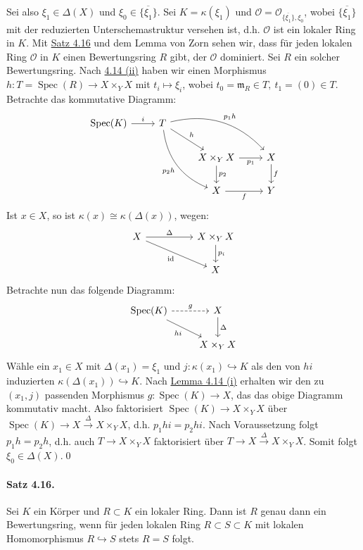 \begin{itemize}
Sei also $\xi_1\in\Delta(X)$ und $\xi_0\in\overline{\{\xi_1\}}$. Sei $K=\kappa(\xi_1)$ und $\mathcal{O}=\mathcal{O}_{\overline{\{\xi_1\}},\xi_0}$, wobei $\overline{\{\xi_1\}}$ mit der reduzierten Unterschemastruktur versehen ist, d.h. $\mathcal{O}$ ist ein lokaler Ring in $K$. Mit \hyperref[4.16]{Satz 4.16} und dem Lemma von Zorn sehen wir, dass für jeden lokalen Ring $\mathcal{O}$ in $K$ einen Bewertungsring $R$ gibt, der $\mathcal{O}$ dominiert. Sei $R$ ein solcher Bewertungsring. Nach \hyperref[4.14]{4.14 (ii)} haben wir einen Morphismus $h:T=\operatorname{Spec}(R)\to X\times_YX$ mit $t_i\mapsto\xi_i$, wobei $t_0=\mathfrak{m}_R\in T,\ t_1=(0)\in T$. Betrachte das kommutative Diagramm:
\[\begin{tikzcd}
\operatorname{Spec}(K)\ar[r, "i"] & T\ar[dr, "h"]\ar[rrd, "p_1h", bend left]\ar[ddr, "p_2h"', bend right]\\
& & X\times_YX\ar[r, "p_1"']\ar[d, "p_2"] & X\ar[d, "f"]\\
&& X\ar[r, "f"'] & Y
\end{tikzcd}\]
Ist $x\in X$, so ist $\kappa(x)\cong\kappa(\Delta(x))$, wegen:
\[\begin{tikzcd}
X\ar[rr, "\Delta"]\ar[rrd, "\operatorname{id}"'] & & X\times_Y X\ar[d, "p_i"]\\
&& X
\end{tikzcd} \]
Betrachte nun das folgende Diagramm:
\[\begin{tikzcd}
\operatorname{Spec}(K)\ar[rd, "hi"']\ar[r, "g", dashed] & X\ar[d, "\Delta"] \\
& X\times_YX
\end{tikzcd}\]
Wähle ein $x_1\in X$ mit $\Delta(x_1)=\xi_1$ und $j:\kappa(x_1)\hookrightarrow K$ als den von $hi$ induzierten $\kappa(\Delta(x_1))\hookrightarrow K$. Nach \hyperref[4.14]{Lemma 4.14 (i)} erhalten wir den zu $(x_1, j)$ passenden Morphismus $g:\operatorname{Spec}(K)\to X$, das das obige Diagramm kommutativ macht. Also faktorisiert $\operatorname{Spec}(K)\to X\times_YX$ über $\operatorname{Spec}(K)\to X\stackrel{\Delta}{\to}X\times_YX$, d.h. $p_1hi=p_2hi$. Nach Voraussetzung folgt $p_1h=p_2h$, d.h. auch $T\to X\times_YX$ faktorisiert über $T\to X\stackrel{\Delta}{\to}X\times_YX$. Somit folgt $\xi_0\in \Delta(X)$.\qed
\end{itemize}

\paragraph{Satz 4.16.}\label{4.16} Sei $K$ ein Körper und $R\subset K$ ein lokaler Ring. Dann ist $R$ genau dann ein Bewertungsring, wenn für jeden lokalen Ring $R\subset S\subset K$ mit lokalen Homomorphismus $R\hookrightarrow S$ stets $R=S$ folgt.

